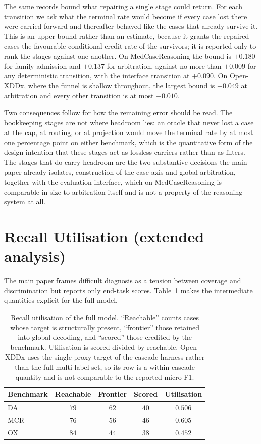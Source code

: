 \documentclass[letterpaper]{article}
\begin{document}
The same records bound what repairing a single stage could return.
For each transition we ask what the terminal rate would become if every case lost there were carried forward and thereafter behaved like the cases that already survive it.
This is an upper bound rather than an estimate, because it grants the repaired cases the favourable conditional credit rate of the survivors; it is reported only to rank the stages against one another.
On MedCaseReasoning the bound is $+0.180$ for family admission and $+0.137$ for arbitration, against no more than $+0.009$ for any deterministic transition, with the interface transition at $+0.090$.
On Open-XDDx, where the funnel is shallow throughout, the largest bound is $+0.049$ at arbitration and every other transition is at most $+0.010$.

Two consequences follow for how the remaining error should be read.
The bookkeeping stages are not where headroom lies: an oracle that never lost a case at the cap, at routing, or at projection would move the terminal rate by at most one percentage point on either benchmark, which is the quantitative form of the design intention that these stages act as lossless carriers rather than as filters.
The stages that do carry headroom are the two substantive decisions the main paper already isolates, construction of the case axis and global arbitration, together with the evaluation interface, which on MedCaseReasoning is comparable in size to arbitration itself and is not a property of the reasoning system at all.

\section{Recall Utilisation (extended analysis)}
\label{sec:utilisation}

The main paper frames difficult diagnosis as a tension between coverage and discrimination but reports only end-task scores.
Table~\ref{tab:utilisation} makes the intermediate quantities explicit for the full model.

\begin{table}[tb]
\centering
\small
\begin{tabular}{@{}lcccc@{}}
\toprule
Benchmark & Reachable & Frontier & Scored & Utilisation \\
\midrule
DA & $79$ & $62$ & $40$ & $0.506$ \\
MCR & $76$ & $56$ & $46$ & $0.605$ \\
OX & $84$ & $44$ & $38$ & $0.452$ \\
\bottomrule
\end{tabular}
\caption{Recall utilisation of the full model. ``Reachable'' counts cases whose target is structurally present, ``frontier'' those retained into global decoding, and ``scored'' those credited by the benchmark. Utilisation is scored divided by reachable. Open-XDDx uses the single proxy target of the cascade harness rather than the full multi-label set, so its row is a within-cascade quantity and is not comparable to the reported micro-F1.}
\label{tab:utilisation}
\end{table}
\end{document}
